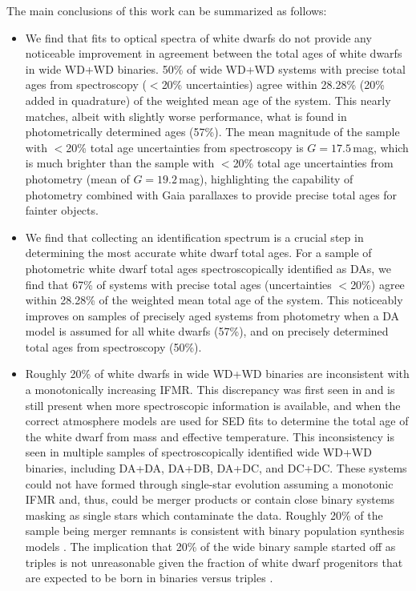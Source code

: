 \documentclass[twocolumn]{aastex631}
\begin{document}
The main conclusions of this work can be summarized as follows:
\begin{itemize}

\item We find that fits to optical spectra of white dwarfs do not provide any noticeable improvement in agreement between the total ages of white dwarfs in wide WD+WD binaries. 50\% of wide WD+WD systems with precise total ages from spectroscopy ($<$20\% uncertainties) agree within 28.28\% (20\% added in quadrature) of the weighted mean age of the system. This nearly matches, albeit with slightly worse performance, what is found in photometrically determined ages (57\%). The mean magnitude of the sample with $<$20\% total age uncertainties from spectroscopy is $G=17.5$\,mag, which is much brighter than the sample with $<$20\% total age uncertainties from photometry (mean of $G=19.2$\,mag), highlighting the capability of photometry combined with Gaia parallaxes to provide precise total ages for fainter objects.

\item We find that collecting an identification spectrum is a crucial step in determining the most accurate white dwarf total ages. For a sample of photometric white dwarf total ages spectroscopically identified as DAs, we find that 67\% of systems with precise total ages (uncertainties $<$20\%) agree within 28.28\% of the weighted mean total age of the system. This noticeably improves on samples of precisely aged systems from photometry when a DA model is assumed for all white dwarfs (57\%), and on precisely determined total ages from spectroscopy (50\%).

\item Roughly 20\% of white dwarfs in wide WD+WD binaries are inconsistent with a monotonically increasing IFMR. This discrepancy was first seen in \cite{2022ApJ...934..148H} and is still present when more spectroscopic information is available, and when the correct atmosphere models are used for SED fits to determine the total age of the white dwarf from mass and effective temperature. This inconsistency is seen in multiple samples of spectroscopically identified wide WD+WD binaries, including DA+DA, DA+DB, DA+DC, and DC+DC. These systems could not have formed through single-star evolution assuming a monotonic IFMR and, thus, could be merger products or contain close binary systems masking as single stars which contaminate the data. Roughly 20\% of the sample being merger remnants is consistent with binary population synthesis models \citep{2020A&A...636A..31T}. The implication that 20\% of the wide binary sample started off as triples is not unreasonable given the fraction of white dwarf progenitors that are expected to be born in binaries versus triples \citep{2017ApJS..230...15M, 2023ApJ...955L..14S}. 


\end{itemize}
\end{document}
